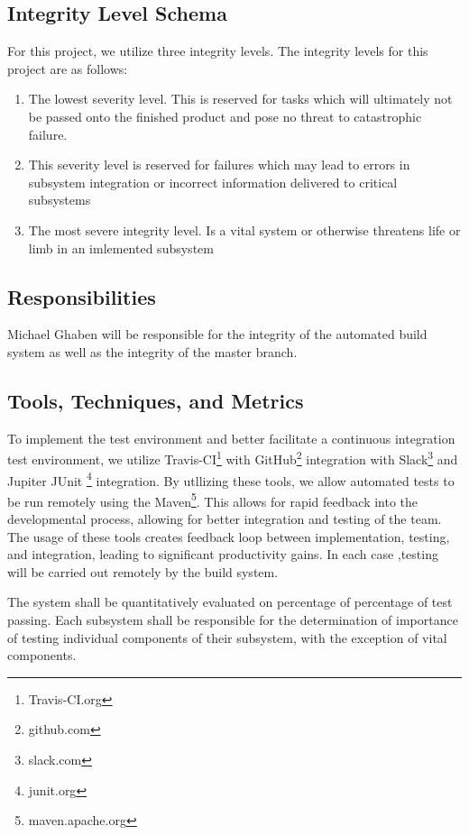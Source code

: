 \documentclass[]{article}
\begin{document}
\subsection{Integrity Level Schema}
For this project, we utilize three integrity levels. The integrity levels for this project are as follows:
\begin{enumerate}
	\item The lowest severity level. This is reserved for tasks which will ultimately not be passed onto the finished product and pose no threat to catastrophic failure. 
	\item This severity level is reserved for failures which may lead to errors in subsystem integration or incorrect information delivered to critical subsystems
	\item The most severe integrity level. Is a vital system or otherwise threatens life or limb in an imlemented subsystem
\end{enumerate}
\subsection{Responsibilities}
Michael Ghaben will be responsible for the integrity of the automated build system as well as the integrity of the master branch.

\subsection{Tools, Techniques, and Metrics}
To implement the test environment and better facilitate a continuous integration test environment, we utilize Travis-CI\footnote{Travis-CI.org} with GitHub\footnote{github.com} integration with Slack\footnote{slack.com} and Jupiter JUnit \footnote{junit.org} integration. By utllizing these tools, we allow automated tests to be run remotely using the Maven\footnote{maven.apache.org}. This allows for rapid feedback into the developmental process, allowing for better integration and testing of the team. The usage of these tools creates feedback loop between implementation, testing, and integration, leading to significant productivity gains. In each case ,testing will be carried out remotely by the build system.

The system shall be quantitatively evaluated on percentage of percentage of test passing. Each subsystem shall be responsible for the determination of importance of testing individual components of their subsystem, with the exception of vital components.
\end{document}
